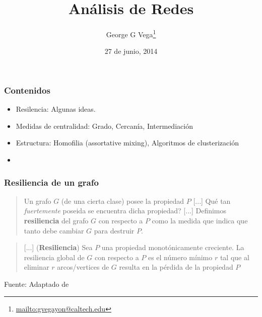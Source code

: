 \documentclass[10pt,draft]{beamer}
\author{George G Vega\thanks{\url{mailto:gvegayon@caltech.edu}}}
\institute{Superintendencia de Pensiones}
\title{An\'alisis de Redes}
\date{27 de junio, 2014}
\begin{document}
\frame{\maketitle}

\begin{frame}
\frametitle{Contenidos}
\tableofcontents
\end{frame}

\begin{frame}
\begin{itemize}
\item Resilencia: Algunas ideas.
\item Medidas de centralidad: Grado, Cercan\'ia, Intermediaci\'on
\item Estructura: Homofilia (assortative mixing), Algoritmos de clusterizaci\'on
\item 
\end{itemize}
\end{frame}

\begin{frame}
\frametitle{Resiliencia de un grafo}

\begin{quote}
Un grafo $G$ (de una cierta clase) posee la propiedad $P$ [...] Qu\'e tan 
\emph{fuertemente} poseida se encuentra dicha propiedad? [...] Definimos
{\bf resiliencia} del grafo $G$ con respecto a $P$ como la medida que indica
que tanto debe cambiar $G$ para destruir $P$.
\end{quote} 

\begin{quote}
[...] ({\bf Resiliencia}) Sea $P$ una propiedad 
monot\'onicamente creciente. La resiliencia global de $G$ con respecto a $P$ es
el n\'umero m\'inimo $r$ tal que al eliminar $r$ arcos/vertices de $G$ resulta
en la p\'erdida de la propiedad $P$
\end{quote}
{\footnotesize Fuente: Adaptado de \cite{sudakov2008local}}
\end{frame}
\end{document}
